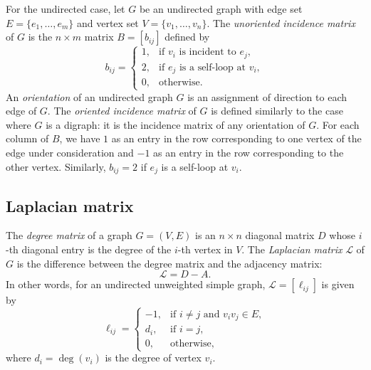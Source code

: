 For the undirected case, let $G$ be an undirected graph with edge set
$E = \{ e_1, \dots, e_m \}$ and vertex set
$V = \{ v_1, \dots, v_n \}$. The \emph{unoriented incidence matrix} of
$G$ is the $n \times m$ matrix $B = [b_{ij}]$ defined by
\[
b_{ij}
=
\begin{cases}
1, & \text{if $v_i$ is incident to $e_j$}, \\
2, & \text{if $e_j$ is a self-loop at $v_i$}, \\
0, & \text{otherwise}.
\end{cases}
\]
An \emph{orientation} of an undirected graph $G$ is an assignment of
direction to each edge of $G$. The \emph{oriented incidence matrix} of
$G$ is defined similarly to the case where $G$ is a digraph: it is the
incidence matrix of any orientation of $G$. For each column of $B$, we
have $1$ as an entry in the row corresponding to one vertex of the
edge under consideration and $-1$ as an entry in the row corresponding
to the other vertex. Similarly, $b_{ij} = 2$ if $e_j$ is a self-loop
at $v_i$.

%



\subsection{Laplacian matrix}

The \emph{degree matrix} of a graph $G = (V,E)$ is an $n \times n$
diagonal matrix $D$ whose $i$-th diagonal entry is the degree of the
$i$-th vertex in $V$.
The \emph{Laplacian matrix} $\mathcal{L}$ of $G$ is the difference
between the degree matrix and the adjacency matrix:
\[
\mathcal{L} = D - A.
\]
In other words, for an undirected unweighted simple graph,
$\mathcal{L} = [\ell_{ij}]$ is given by
\[
\ell_{ij}
=
\begin{cases}
-1,  & \text{if $i \neq j$ and $v_i v_j \in E$}, \\
d_i, & \text{if $i = j$}, \\
0,   & \text{otherwise},
\end{cases}
\]
where $d_i = \deg(v_i)$ is the degree of vertex $v_i$.

